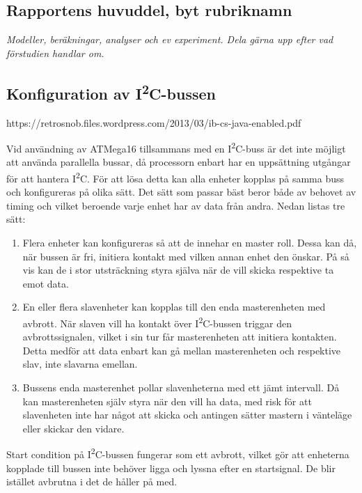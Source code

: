 \documentclass[11pt]{article}
\begin{document}
\begin{flushleft}
\pagebreak

\section{Rapportens huvuddel, byt rubriknamn}
\textit{Modeller, beräkningar, analyser och ev experiment. Dela gärna upp efter vad förstudien handlar om.}

\subsection{Konfiguration av I\textsuperscript{2}C-bussen}
https://retrosnob.files.wordpress.com/2013/03/ib-cs-java-enabled.pdf 

Vid användning av ATMega16 tillsammans med en I\textsuperscript{2}C-buss är det inte möjligt att använda parallella bussar, då processorn enbart har en uppsättning utgångar för att hantera I\textsuperscript{2}C. För att lösa detta kan alla enheter kopplas på samma buss och konfigureras på olika sätt. Det sätt som passar bäst beror både av behovet av timing och vilket beroende varje enhet har av data från andra. Nedan listas tre sätt:

\begin{enumerate}
 \item Flera enheter kan konfigureras så att de innehar en master roll. Dessa kan då, när bussen är fri, initiera kontakt med vilken annan enhet den önskar. På så vis kan de i stor utsträckning styra själva när de vill skicka respektive ta emot data.
 
 \item En eller flera slavenheter kan kopplas till den enda masterenheten med avbrott. När slaven vill ha kontakt över I\textsuperscript{2}C-bussen triggar den avbrottssignalen, vilket i sin tur får masterenheten att initiera kontakten. Detta medför att data enbart kan gå mellan masterenheten och respektive slav, inte slavarna emellan.
 
 \item Bussens enda masterenhet pollar slavenheterna med ett jämt intervall. Då kan masterenheten själv styra när den vill ha data, med risk för att slavenheten inte har något att skicka och antingen sätter mastern i vänteläge eller skickar den vidare.
\end{enumerate}


Start condition på I\textsuperscript{2}C-bussen fungerar som ett avbrott, vilket gör att enheterna kopplade till bussen inte behöver ligga och lyssna efter en startsignal. De blir istället avbrutna i det de håller på med.


\end{flushleft}
\end{document}
